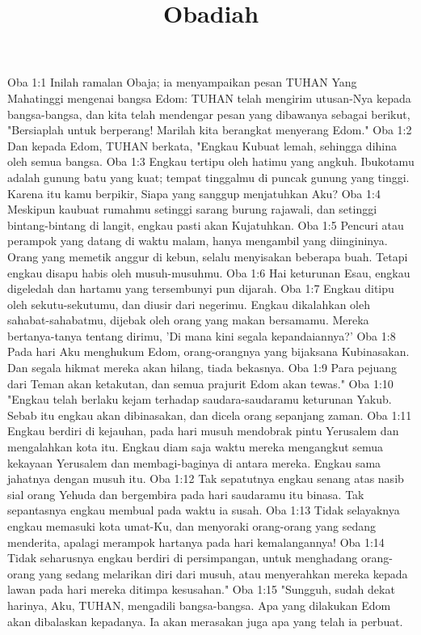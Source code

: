 

\title{Obadiah}

Oba 1:1  Inilah ramalan Obaja; ia menyampaikan pesan TUHAN Yang Mahatinggi mengenai bangsa Edom: TUHAN telah mengirim utusan-Nya kepada bangsa-bangsa, dan kita telah mendengar pesan yang dibawanya sebagai berikut, "Bersiaplah untuk berperang! Marilah kita berangkat menyerang Edom."
Oba 1:2  Dan kepada Edom, TUHAN berkata, "Engkau Kubuat lemah, sehingga dihina oleh semua bangsa.
Oba 1:3  Engkau tertipu oleh hatimu yang angkuh. Ibukotamu adalah gunung batu yang kuat; tempat tinggalmu di puncak gunung yang tinggi. Karena itu kamu berpikir, Siapa yang sanggup menjatuhkan Aku?
Oba 1:4  Meskipun kaubuat rumahmu setinggi sarang burung rajawali, dan setinggi bintang-bintang di langit, engkau pasti akan Kujatuhkan.
Oba 1:5  Pencuri atau perampok yang datang di waktu malam, hanya mengambil yang diingininya. Orang yang memetik anggur di kebun, selalu menyisakan beberapa buah. Tetapi engkau disapu habis oleh musuh-musuhmu.
Oba 1:6  Hai keturunan Esau, engkau digeledah dan hartamu yang tersembunyi pun dijarah.
Oba 1:7  Engkau ditipu oleh sekutu-sekutumu, dan diusir dari negerimu. Engkau dikalahkan oleh sahabat-sahabatmu, dijebak oleh orang yang makan bersamamu. Mereka bertanya-tanya tentang dirimu, 'Di mana kini segala kepandaiannya?'
Oba 1:8  Pada hari Aku menghukum Edom, orang-orangnya yang bijaksana Kubinasakan. Dan segala hikmat mereka akan hilang, tiada bekasnya.
Oba 1:9  Para pejuang dari Teman akan ketakutan, dan semua prajurit Edom akan tewas."
Oba 1:10  "Engkau telah berlaku kejam terhadap saudara-saudaramu keturunan Yakub. Sebab itu engkau akan dibinasakan, dan dicela orang sepanjang zaman.
Oba 1:11  Engkau berdiri di kejauhan, pada hari musuh mendobrak pintu Yerusalem dan mengalahkan kota itu. Engkau diam saja waktu mereka mengangkut semua kekayaan Yerusalem dan membagi-baginya di antara mereka. Engkau sama jahatnya dengan musuh itu.
Oba 1:12  Tak sepatutnya engkau senang atas nasib sial orang Yehuda dan bergembira pada hari saudaramu itu binasa. Tak sepantasnya engkau membual pada waktu ia susah.
Oba 1:13  Tidak selayaknya engkau memasuki kota umat-Ku, dan menyoraki orang-orang yang sedang menderita, apalagi merampok hartanya pada hari kemalangannya!
Oba 1:14  Tidak seharusnya engkau berdiri di persimpangan, untuk menghadang orang-orang yang sedang melarikan diri dari musuh, atau menyerahkan mereka kepada lawan pada hari mereka ditimpa kesusahan."
Oba 1:15  "Sungguh, sudah dekat harinya, Aku, TUHAN, mengadili bangsa-bangsa. Apa yang dilakukan Edom akan dibalaskan kepadanya. Ia akan merasakan juga apa yang telah ia perbuat.
